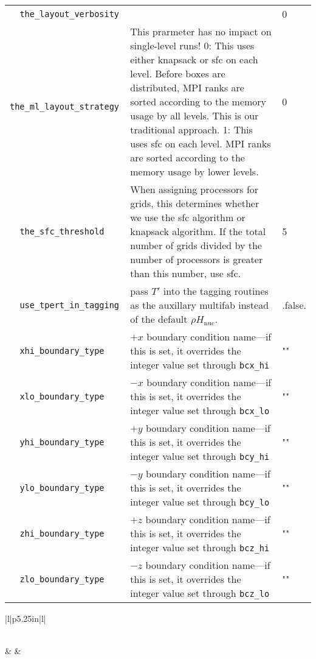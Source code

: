 \begin{landscape}
{\begin{center}
\begin{longtable}{|l|p{5.25in}|l|}
\verb=  the_layout_verbosity  = &    &  0 \\
\rowcolor{tableShade}
\verb=  the_ml_layout_strategy  = &   This prarmeter has no impact on single-level runs! 0: This uses either knapsack or sfc on each level.  Before boxes are    distributed, MPI ranks are sorted according to the memory usage by    all levels.  This is our traditional approach. 1: This uses sfc on each level.  MPI ranks are sorted according to the    memory usage by lower levels.  &  0 \\
\verb=  the_sfc_threshold  = &   When assigning processors for grids, this determines whether we use the sfc algorithm or knapsack algorithm.  If the total number of grids divided by the number of processors is greater than this number, use sfc.  &  5 \\
\rowcolor{tableShade}
\verb=  use_tpert_in_tagging  = &   pass $T'$ into the tagging routines as the auxillary multifab instead of the default $\rho H_\mathrm{nuc}$.  &  .false. \\
\verb=  xhi_boundary_type  = &   $+x$ boundary condition name---if this is set, it overrides the integer value set through {\tt bcx\_hi}  &  "" \\
\rowcolor{tableShade}
\verb=  xlo_boundary_type  = &   $-x$ boundary condition name---if this is set, it overrides the integer value set through {\tt bcx\_lo}  &  "" \\
\verb=  yhi_boundary_type  = &   $+y$ boundary condition name---if this is set, it overrides the integer value set through {\tt bcy\_hi}  &  "" \\
\rowcolor{tableShade}
\verb=  ylo_boundary_type  = &   $-y$ boundary condition name---if this is set, it overrides the integer value set through {\tt bcy\_lo}  &  "" \\
\verb=  zhi_boundary_type  = &   $+z$ boundary condition name---if this is set, it overrides the integer value set through {\tt bcz\_hi}  &  "" \\
\rowcolor{tableShade}
\verb=  zlo_boundary_type  = &   $-z$ boundary condition name---if this is set, it overrides the integer value set through {\tt bcz\_lo}  &  "" \\


\end{longtable}
\end{center}

} %


{\small

\renewcommand{\arraystretch}{1.5}
%
\begin{center}
\begin{longtable}{|l|p{5.25in}|l|}
\caption[ heating
 parameters.]{ heating
 parameters.} \label{table:  heating
 parameters. runtime} \\
%
\hline {} & 
        & 
        \\ \hline 
\endfirsthead


\end{longtable}
\end{center}}
\end{landscape}
